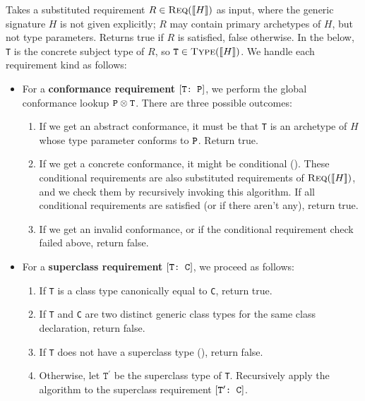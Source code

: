 \documentclass[../generics]{subfiles}
\begin{document}
\begin{algorithm}\label{reqissatisfied}
Takes a substituted requirement $R\in\textsc{Req}({[\![H]\!]})$ as input, where the generic signature $H$ is not given explicitly; $R$ may contain primary archetypes of $H$, but not type parameters. Returns true if $R$ is satisfied, false otherwise. In the below, \texttt{T} is the concrete subject type of $R$, so $\texttt{T}\in\textsc{Type}({[\![H]\!]})$. We handle each requirement kind as follows:
\begin{itemize}
\item For a \textbf{conformance requirement} $[\texttt{T:~P}]$, we perform the global conformance lookup $\texttt{P} \otimes \texttt{T}$. There are three possible outcomes:
\begin{enumerate}
\item If we get an abstract conformance, it must be that \texttt{T} is an archetype of $H$ whose type parameter conforms to $\texttt{P}$. Return true.
\item If we get a concrete conformance, it might be conditional (). These conditional requirements are also substituted requirements of $\textsc{Req}({[\![H]\!]})$, and we check them by recursively invoking this algorithm. If all conditional requirements are satisfied (or if there aren't any), return true.
\item If we get an invalid conformance, or if the conditional requirement check failed above, return false.
\end{enumerate}
\item For a \textbf{superclass requirement} $[\texttt{T:~C}]$, we proceed as follows:
\begin{enumerate}
\item If \texttt{T} is a class type canonically equal to \texttt{C}, return true.
\item If \texttt{T} and \texttt{C} are two distinct generic class types for the same class declaration, return false.
\item If \texttt{T} does not have a superclass type (), return false.
\item Otherwise, let $\texttt{T}^\prime$ be the superclass type of \texttt{T}. Recursively apply the algorithm to the superclass requirement $[\texttt{$\texttt{T}^\prime$:~C}]$.

\end{enumerate}
\end{itemize}
\end{algorithm}
\end{document}
